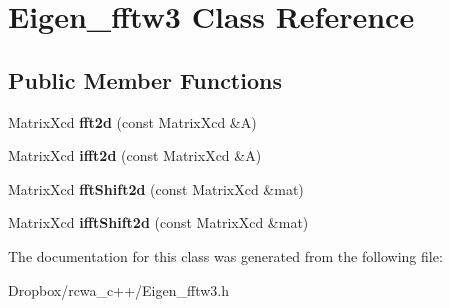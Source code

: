 \hypertarget{class_eigen__fftw3}{}\section{Eigen\+\_\+fftw3 Class Reference}
\label{class_eigen__fftw3}
\subsection*{Public Member Functions}
\begin{DoxyCompactItemize}
\item 
Matrix\+Xcd {\bfseries fft2d} (const Matrix\+Xcd \&A)\hypertarget{class_eigen__fftw3_a9da7bca832051acac749dd03389970fa}{}\label{class_eigen__fftw3_a9da7bca832051acac749dd03389970fa}

\item 
Matrix\+Xcd {\bfseries ifft2d} (const Matrix\+Xcd \&A)\hypertarget{class_eigen__fftw3_a7f6d00e9307778eb43d39a62f456c632}{}\label{class_eigen__fftw3_a7f6d00e9307778eb43d39a62f456c632}

\item 
Matrix\+Xcd {\bfseries fft\+Shift2d} (const Matrix\+Xcd \&mat)\hypertarget{class_eigen__fftw3_a91dbb069d200585f141dba6f83d1fcd2}{}\label{class_eigen__fftw3_a91dbb069d200585f141dba6f83d1fcd2}

\item 
Matrix\+Xcd {\bfseries ifft\+Shift2d} (const Matrix\+Xcd \&mat)\hypertarget{class_eigen__fftw3_a70acbe5cc83f58ad4dd41711c6fffbbc}{}\label{class_eigen__fftw3_a70acbe5cc83f58ad4dd41711c6fffbbc}

\end{DoxyCompactItemize}


The documentation for this class was generated from the following file\+:\begin{DoxyCompactItemize}
\item 
Dropbox/rcwa\+\_\+c++/Eigen\+\_\+fftw3.\+h\end{DoxyCompactItemize}
